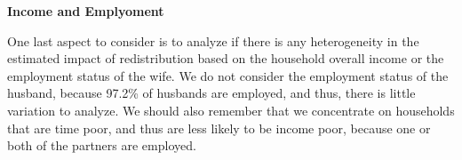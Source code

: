 \documentclass[
  11pt,
]{article}
\begin{document}
\textbf{Income and Emplyoment}

One last aspect to consider is to analyze if there is any heterogeneity
in the estimated impact of redistribution based on the household overall
income or the employment status of the wife. We do not consider the
employment status of the husband, because 97.2\% of husbands are
employed, and thus, there is little variation to analyze. We should also
remember that we concentrate on households that are time poor, and thus
are less likely to be income poor, because one or both of the partners
are employed.

\begin{table}

\caption{\label{tbl-tb4}Time Poverty by Income}


\end{table}%
\end{document}
